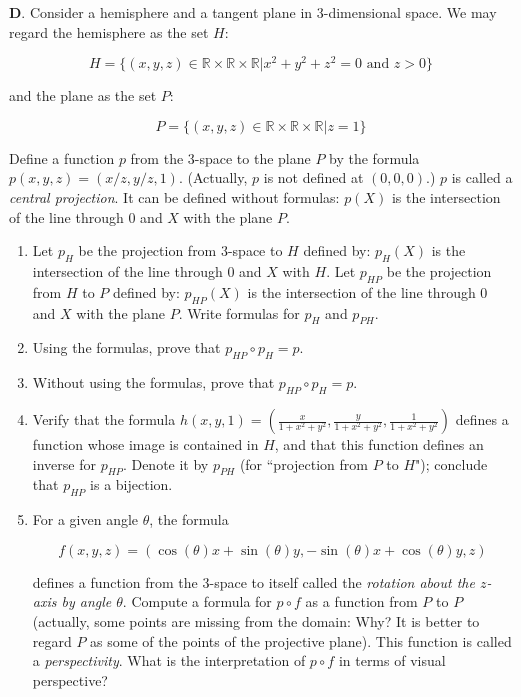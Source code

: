\documentclass[12pt]{article}
\begin{document}
\textbf{D}.  Consider a hemisphere and a tangent plane in 3-dimensional space.  We may regard the hemisphere as the set $H$:

\[H=\{ (x,y,z)\in \mathbb{R}\times\mathbb{R}\times\mathbb{R}| x^{2}+y^{2}+z^{2}=0 \text{ and } z>0\}\]

and the plane as the set $P$:

\[P=\{(x,y,z)\in \mathbb{R}\times\mathbb{R}\times\mathbb{R}| z=1\}\]

Define a function $p$ from the 3-space to the plane $P$ by the formula $p(x,y,z)=(x/z,y/z,1)$.  (Actually, $p$ is not defined at $(0,0,0)$.)  $p$ is called a \emph{central projection}.  It can be defined without formulas: $p(X)$ is the intersection of the line through $0$ and $X$ with the plane $P$.

\begin{enumerate}
\item{Let $p_H$ be the projection from 3-space to $H$ defined by: $p_H(X)$ is the intersection of the line through $0$ and $X$ with $H$.  Let $p_{HP}$ be the projection from $H$ to $P$ defined by: $p_{HP}(X)$ is the intersection of the line through $0$ and $X$ with the plane $P$.  Write formulas for $p_H$ and $p_{PH}$.}
\item{Using the formulas, prove that $p_{HP}\circ p_H = p$.}
\item{Without using the formulas, prove that $p_{HP}\circ p_H = p$.}
\item{Verify that the formula $h(x,y,1)=\left(\frac{x}{1+x^{2}+y^{2}},\frac{y}{1+x^{2}+y^{2}},\frac{1}{1+x^{2}+y^{2}}\right)$ defines a function whose image is contained in $H$, and that this function defines an inverse for $p_{HP}$.  Denote it by $p_{PH}$ (for ``projection from $P$ to $H$"); conclude that $p_{HP}$ is a bijection.}
\item{For a given angle $\theta$, the formula

\[f(x,y,z)=(\cos(\theta)x +\sin(\theta)y,-\sin(\theta)x+\cos(\theta)y,z)\]

defines a function from the 3-space to itself called the \emph{rotation about the $z$-axis by angle $\theta$}.  Compute a formula for $p\circ f$ as a function from $P$ to $P$ (actually, some points are missing from the domain: Why?  It is better to regard $P$ as some of the points of the projective plane).  This function is called a \emph{perspectivity}.  What is the interpretation of $p\circ f$ in terms of visual perspective?
}
\end{enumerate}
\end{document}
